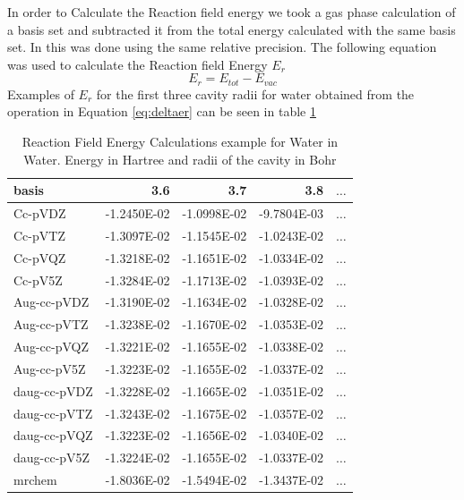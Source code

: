 \documentclass[../master_thesis.tex]{subfiles}
\begin{document}
In order to Calculate the Reaction field energy we took a gas phase calculation
of a basis set and subtracted it from the total energy calculated with the same
basis set. In \mrchem this was done using the same relative precision. The
following equation was used to calculate the Reaction field Energy $E_r$
\begin{equation}\label{eq:deltaer}
  E_r = E_{tot} - E_{vac}
\end{equation}
Examples of $E_r$ for the first three cavity radii for water obtained from the operation
in Equation \ref{eq:deltaer} can be seen in table \ref{tab:Erwatdata}

\begin{table}[htbp]
\caption{Reaction Field Energy Calculations example for Water in Water. Energy in Hartree and radii of the cavity in Bohr}
\begin{center}
\begin{tabular}{|l|r|r|r|r|}
\hline
basis & 3.6 & 3.7 & 3.8 & $\ldots$\\ \hline
Cc-pVDZ & -1.2450E-02 & -1.0998E-02 & -9.7804E-03 & $\ldots$\\ \hline
Cc-pVTZ & -1.3097E-02 & -1.1545E-02 & -1.0243E-02 & $\ldots$\\ \hline
Cc-pVQZ & -1.3218E-02 & -1.1651E-02 & -1.0334E-02 & $\ldots$\\ \hline
Cc-pV5Z & -1.3284E-02 & -1.1713E-02 & -1.0393E-02 & $\ldots$\\ \hline
Aug-cc-pVDZ & -1.3190E-02 & -1.1634E-02 & -1.0328E-02 & $\ldots$\\ \hline
Aug-cc-pVTZ & -1.3238E-02 & -1.1670E-02 & -1.0353E-02 & $\ldots$\\ \hline
Aug-cc-pVQZ & -1.3221E-02 & -1.1655E-02 & -1.0338E-02 & $\ldots$\\ \hline
Aug-cc-pV5Z & -1.3223E-02 & -1.1655E-02 & -1.0337E-02 & $\ldots$\\ \hline
daug-cc-pVDZ & -1.3228E-02 & -1.1665E-02 & -1.0351E-02 & $\ldots$\\ \hline
daug-cc-pVTZ & -1.3243E-02 & -1.1675E-02 & -1.0357E-02 & $\ldots$\\ \hline
daug-cc-pVQZ & -1.3223E-02 & -1.1656E-02 & -1.0340E-02 & $\ldots$\\ \hline
daug-cc-pV5Z & -1.3224E-02 & -1.1655E-02 & -1.0337E-02 & $\ldots$\\ \hline
mrchem & -1.8036E-02 & -1.5494E-02 & -1.3437E-02 & $\ldots$\\ \hline
\end{tabular}
\end{center}
\label{tab:Erwatdata}
\end{table}
\end{document}
